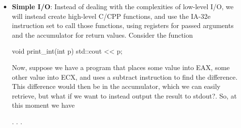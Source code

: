 \documentclass{report}
\begin{document}
\begin{itemize}
\begin{cppcode}
{{                        // Right shift 8 bits to place the next 8-bits in the 8 low order bit position for next iteration.
                        value>>=8;
                    }
                } 
            \end{cppcode}
            \bigbreak \noindent 
            Then, suppose we want to place
            \bigbreak \noindent 
            \begin{cppcode}
            // Some random int64
            long long useful_int64 = 0x80C24FA11AF32C08;
            \end{cppcode}
            \bigbreak \noindent 
            Then, 
            \bigbreak \noindent 
            \begin{cppcode}
            load_imm64(prog, p_offset, useful_int64);
            \end{cppcode}
            \bigbreak \noindent 
            Places this value into our program buffer. This exercise is useful if, for example, we require an address placed into our program buffer to be used as an operand.
        \item \textbf{Simple I/O}: Instead of dealing with the complexities of low-level I/O, we will instead create high-level C/CPP functions, and use the IA-32e instruction set to call those functions, using registers for passed arguments and the accumulator for return values.
            \bigbreak \noindent 
            Consider the function
            \bigbreak \noindent 
            \begin{cppcode}
                void print_int(int p) {
                    std::cout << p;
                }
            \end{cppcode}
            \bigbreak \noindent 
            Now, suppose we have a program that places some value into EAX, some other value into ECX, and uses a subtract instruction to find the difference. This difference would then be in the accumulator, which we can easily retrieve, but what if we want to instead output the result to stdout?. So, at this moment we have
            \bigbreak \noindent 
            \begin{cppcode}
            .
            .
            .


\end{cppcode}
\end{itemize}
\end{document}

